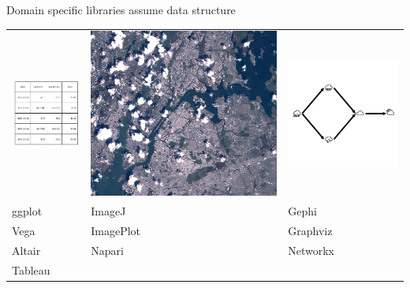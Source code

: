 \documentclass[xcolor={dvipsnames}, handout]{beamer}
\begin{document}
\begin{frame}{Domain specific libraries assume data structure\cite{HeerSoftware2006}}
    \begin{table}
        \begin{tabulary}{\textwidth}{|L|l|l|}\toprule
            \includegraphics[width=.24\textwidth]{figures/intro/table.png} & \includegraphics[width=.3\textwidth]{figures/intro/landsat.png} & \includegraphics[width=.33\textwidth]{figures/math/graph.png} \\
            ggplot\cite{wickhamGgplot2ElegantGraphics2016a}  & ImageJ\cite{schneiderNIHImageImageJ2012}& Gephi\cite{bastianGephiOpenSource2009}\\
            Vega\cite{satyanarayanDeclarativeInteractionDesign2014} & ImagePlot\cite{studiesCulturevisImageplot2021} & Graphviz\cite{ellsonGraphvizOpenSource2002}\\
            Altair\cite{vanderplasAltairInteractiveStatistical2018}& Napari\cite{nicholas_sofroniew_2021_4533308} & Networkx\cite{HagbergExploringNetwork2008}\\
             Tableau\cite{StoltePolaris2002,hanrahanVizQL2006,MackinlayShowme2007} & &\\
             \bottomrule
        \end{tabulary}
    \end{table}
\end{frame}
\end{document}
